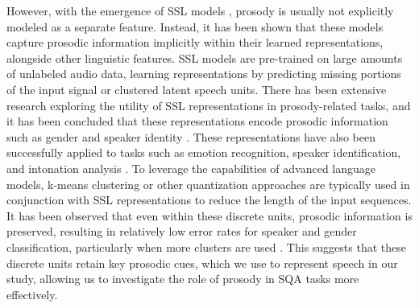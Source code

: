 However, with the emergence of SSL models \cite{Baevski2020wav2vec2A, hsu2021hubert, chen2022wavlm}, prosody is usually not explicitly modeled as a separate feature. Instead, it has been shown that these models capture prosodic information implicitly within their learned representations, alongside other linguistic features. SSL models are pre-trained on large amounts of unlabeled audio data, learning representations by predicting missing portions of the input signal or clustered latent speech units. There has been extensive research exploring the utility of SSL representations in prosody-related tasks, and it has been concluded that these representations encode prosodic information such as gender and speaker identity \cite{deseyssel22_interspeech, oli, Mukhtar}. These representations have also been successfully applied to tasks such as emotion recognition, speaker identification, and intonation analysis \cite{10023234}. To leverage the capabilities of advanced language models, k-means clustering or other quantization approaches are typically used in conjunction with SSL representations to reduce the length of the input sequences. It has been observed that even within these discrete units, prosodic information is preserved, resulting in relatively low error rates for speaker and gender classification, particularly when more clusters are used \cite{deseyssel22_interspeech}. This suggests that these discrete units retain key prosodic cues, which we use to represent speech in our study, allowing us to investigate the role of prosody in SQA tasks more effectively.